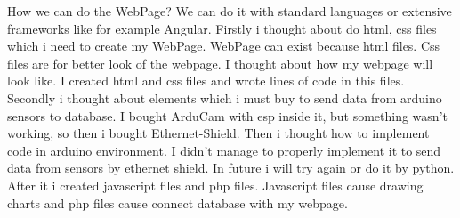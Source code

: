 How we can do the WebPage? We can do it with standard languages or extensive frameworks like for example Angular. Firstly i thought about do html, css files which i need to create my WebPage. WebPage can exist because html files. Css files are for better look of the webpage. I thought about how my webpage will look like. I created html and css files and wrote lines of code in this files. Secondly i thought about elements which i must buy to send data from arduino sensors to database. I bought ArduCam with esp inside it, but something wasn't working, so then i bought Ethernet-Shield. Then i thought how to implement code in arduino environment. I didn't manage to properly implement it to send data from sensors by ethernet shield. In future i will try again or do it by python. After it i created javascript files and php files. Javascript files cause drawing charts and php files cause connect database with my webpage. 